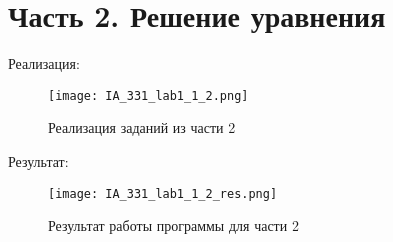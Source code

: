 \chapter{Часть 2. Решение уравнения}
\label{ch:chap2}

Реализация:\\

\begin{figure}[ht]
    \centering
    \texttt{[image: IA\_331\_lab1\_1\_2.png]}
    \caption{Реализация заданий из части 2}
    \label{fig:open_audio}
\end{figure}

Результат:\\

\begin{figure}[ht]
    \centering
    \texttt{[image: IA\_331\_lab1\_1\_2\_res.png]}
    \caption{Результат работы программы для части 2}
    \label{fig:open_audio}
\end{figure}

\endinput